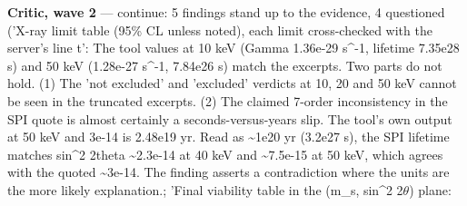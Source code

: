 \documentclass[11pt,a4paper]{article}
\begin{document}
\textbf{Critic, wave 2} --- continue: 5 findings stand up to the evidence, 4 questioned ('X-ray limit table (95\% CL unless noted), each limit cross-checked with the server's line t': The tool values at 10 keV (Gamma 1.36e-29 s\textasciicircum{}-1, lifetime 7.35e28 s) and 50 keV (1.28e-27 s\textasciicircum{}-1, 7.84e26 s) match the excerpts. Two parts do not hold. (1) The 'not excluded' and 'excluded' verdicts at 10, 20 and 50 keV cannot be seen in the truncated excerpts. (2) The claimed 7-order inconsistency in the SPI quote is almost certainly a seconds-versus-years slip. The tool's own output at 50 keV and 3e-14 is 2.48e19 yr. Read as \textasciitilde{}1e20 yr (3.2e27 s), the SPI lifetime matches sin\textasciicircum{}2 2theta \textasciitilde{}2.3e-14 at 40 keV and \textasciitilde{}7.5e-15 at 50 keV, which agrees with the quoted \textasciitilde{}3e-14. The finding asserts a contradiction where the units are the more likely explanation.; 'Final viability table in the (m\_s, sin\textasciicircum{}2 2$\theta$) plane:
\end{document}
